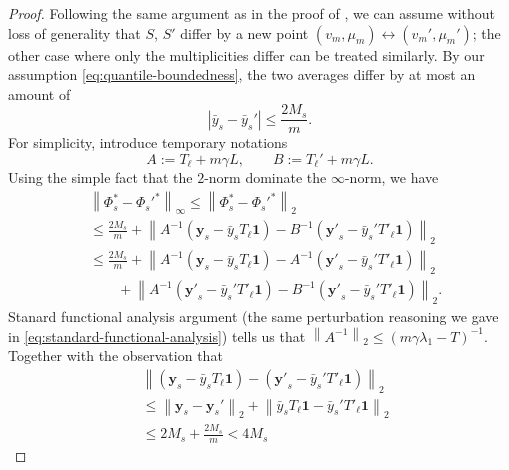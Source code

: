 \documentclass[letterpaper]{article} %
\begin{document}
\begin{proof}
  Following the same argument as in the proof of \cite[Theorem 5]{Belkin2004}, we can assume without loss of generality that $S$, $S'$ differ by a new point $\left( v_m,\mu_m \right)\leftrightarrow \left( v_m',\mu_m' \right)$; the other case where only the multiplicities differ can be treated similarly. By our assumption \eqref{eq:quantile-boundedness}, the two averages differ by at most an amount of
  \begin{equation*}
    \left| \bar{y}_s-\bar{y}_s' \right|\leq \frac{2M_s}{m}.
  \end{equation*}
  For simplicity, introduce temporary notations
  \begin{equation*}
    A:=T_{\ell}+m\gamma L,\qquad B:=T_{\ell}'+m\gamma L.
  \end{equation*}
  Using the simple fact that the $2$-norm dominate the $\infty$-norm, we have
  \begin{equation*}
    \begin{aligned}
      &\left\| \Phi_s^{*} -\Phi_s'^{*} \right\|_{\infty} \leq \left\| \Phi_s^{*} -\Phi_s'^{*} \right\|_2\\
      &\leq \frac{2M_s}{m}+\left\| A^{-1}\left(\mathbf{y}_s-\bar{y}_sT_\ell\mathbf{1}\right)-B^{-1}\left(\mathbf{y'}_s-\bar{y}_s'T'_\ell\mathbf{1}\right) \right\|_2\\
      &\leq \frac{2M_s}{m}+\left\| A^{-1}\left(\mathbf{y}_s-\bar{y}_sT_\ell\mathbf{1}\right)-A^{-1}\left(\mathbf{y'}_s-\bar{y}_s'T'_\ell\mathbf{1}\right) \right\|_2\\
      &\qquad+\left\| A^{-1}\left(\mathbf{y'}_s-\bar{y}_s'T'_\ell\mathbf{1}\right)-B^{-1}\left(\mathbf{y'}_s-\bar{y}_s'T'_\ell\mathbf{1}\right) \right\|_2.
    \end{aligned}
  \end{equation*}
  Stanard functional analysis argument (the same perturbation reasoning we gave in \eqref{eq:standard-functional-analysis}) tells us that $\left\| A^{-1} \right\|_2\leq \left( m\gamma\lambda_1-T \right)^{-1}$. Together with the observation that
    \begin{align*}
      &\left\| \left(\mathbf{y}_s-\bar{y}_sT_\ell\mathbf{1}\right) - \left(\mathbf{y'}_s-\bar{y}_s'T'_\ell\mathbf{1}\right) \right\|_2\\
      &\leq \left\| \mathbf{y}_s-\mathbf{y}_s' \right\|_2+\left\| \bar{y}_sT_\ell\mathbf{1}-\bar{y}_s'T'_\ell\mathbf{1} \right\|_2\\
      &\leq 2M_s+\frac{2M_s}{m}<4M_s
    \end{align*}

\end{proof}
\end{document}
